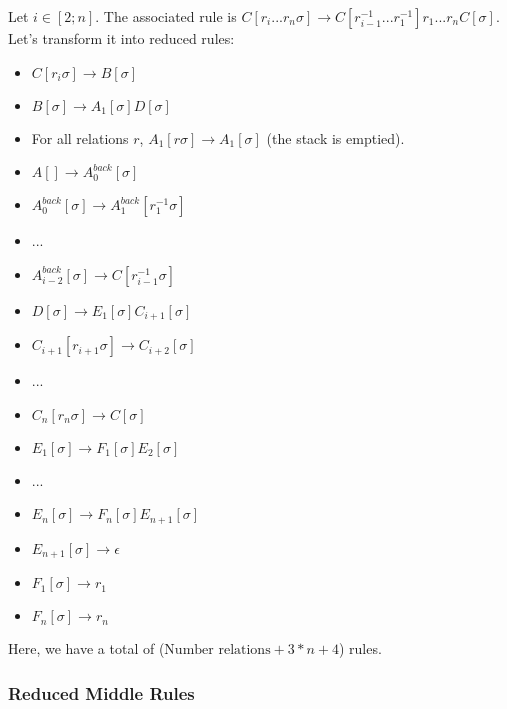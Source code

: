 \documentclass[10pt,a4paper,draft]{article}
\begin{document}
Let $i \in [2; n]$. The associated rule is $C[r_i ... r_n \sigma] \rightarrow C[r_{i-1}^{-1} ... r_1^{-1}] r_1 ... r_n C[\sigma]$. Let's transform it into reduced rules:
\begin{itemize}
\item $C[r_i \sigma] \rightarrow B[\sigma]$
\item $B[\sigma] \rightarrow A_1[\sigma] D[\sigma]$
\item For all relations $r$, $A_1[r \sigma] \rightarrow A_1[\sigma]$ (the stack is emptied).
\item $A[] \rightarrow A^{back}_{0}[\sigma]$
\item $A^{back}_{0}[\sigma] \rightarrow A^{back}_{1}[r_1^{-1} \sigma]$
\item ...
\item $A^{back}_{i-2}[\sigma] \rightarrow C[r_{i-1}^{-1} \sigma]$
\item $D[\sigma] \rightarrow E_1[\sigma]C_{i+1}[\sigma]$
\item $C_{i+1}[r_{i+1} \sigma] \rightarrow C_{i+2}[\sigma]$
\item ...
\item $C_{n}[r_{n} \sigma] \rightarrow C[\sigma]$
\item $E_1[\sigma] \rightarrow F_1[\sigma] E_2[\sigma]$
\item ...
\item $E_n[\sigma] \rightarrow F_n[\sigma] E_{n+1}[\sigma]$
\item $E_{n+1}[\sigma] \rightarrow \epsilon$
\item $F_1[\sigma] \rightarrow r_1$
\item $F_n[\sigma] \rightarrow r_n$
\end{itemize}

Here, we have a total of ($\textrm{Number relations} + 3 * n + 4$) rules.

\subsubsection{Reduced Middle Rules}
\label{reducedmiddlerules}
\end{document}
